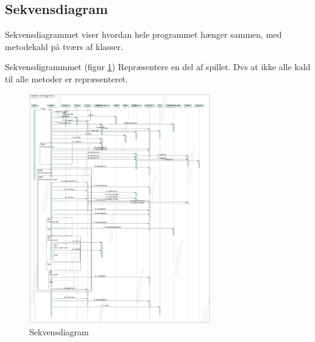 \subsection{Sekvensdiagram}
Sekvensdiagrammet viser hvordan hele programmet hænger sammen, med metodekald på tværs af klasser. 

Sekvensdigrammmet (figur \ref{fig:Sekvensdiagram}) Repræsentere en del af spillet. Dvs at ikke alle kald til alle metoder er repræsenteret.

\begin{figure}[h]
    \centering
    \includegraphics[width=0.7\textwidth]{sources/6_design/sekvens.jpg}
    \caption{Sekvensdiagram}
    \label{fig:Sekvensdiagram}
\end{figure}
